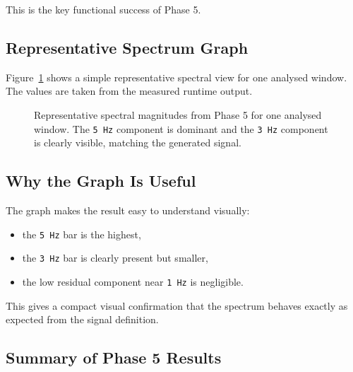 \documentclass[12pt,a4paper]{article}
\begin{document}
This is the key functional success of Phase 5.

\subsection{Representative Spectrum Graph}

Figure~\ref{fig:phase5-spectrum} shows a simple representative spectral view
for one analysed window. The values are taken from the measured runtime output.

\begin{figure}[h]
\centering
{}
\caption{Representative spectral magnitudes from Phase 5 for one analysed window. The \texttt{5 Hz} component is dominant and the \texttt{3 Hz} component is clearly visible, matching the generated signal.}
\label{fig:phase5-spectrum}
\end{figure}

\subsection{Why the Graph Is Useful}

The graph makes the result easy to understand visually:

\begin{itemize}
    \item the \texttt{5 Hz} bar is the highest,
    \item the \texttt{3 Hz} bar is clearly present but smaller,
    \item the low residual component near \texttt{1 Hz} is negligible.
\end{itemize}

This gives a compact visual confirmation that the spectrum behaves exactly as
expected from the signal definition.

\subsection{Summary of Phase 5 Results}
\end{document}
